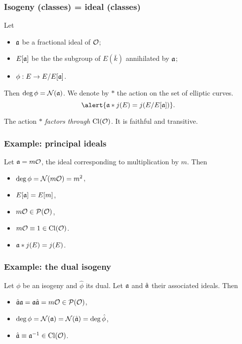 \documentclass{beamer}
\begin{document}

\begin{frame}
  \frametitle{Isogeny (classes) = ideal (classes)}
  
  \begin{definition}
    Let
    \begin{itemize}
    \item \emph{${\mathfrak{a}}$} be a fractional ideal of $\mathcal{O}$;
    \item \emph{$E[{\mathfrak{a}}]$} be the the subgroup of $E(\bar{k})$
      annihilated by ${\mathfrak{a}}$;
    \item \emph{$\phi:E\to E/E[{\mathfrak{a}}]$}.
    \end{itemize}
    Then \emph{$\deg\phi = \mathcal{N}({\mathfrak{a}})$}. We denote by \alert{$\ast$} the
    action on the set of elliptic curves.
    \[\alert{\a\ast j(E) = j(E/E[\a])}.\]
  \end{definition}

  \begin{theorem}
    The action $\ast$ \emph{factors through $\operatorname{Cl}(\mathcal{O})$}. It is faithful
    and transitive.
  \end{theorem}
\end{frame}


\begin{frame}
  \frametitle{Example: principal ideals}

  Let \emph{${\mathfrak{a}} = m\mathcal{O}$}, the ideal corresponding to multiplication by
  $m$. Then
  \begin{itemize}
  \item $\deg\phi = \mathcal{N}(m\mathcal{O}) = m^2$,
  \item $E[{\mathfrak{a}}] = E[m]$,
  \item $m\mathcal{O} \in \mathcal{P}(\mathcal{O})$,
  \item $m\mathcal{O} \equiv 1 \in \operatorname{Cl}(\mathcal{O})$.
  \item ${\mathfrak{a}}\ast j(E) = j(E)$.
  \end{itemize}
\end{frame}


\begin{frame}
  \frametitle{Example: the dual isogeny}

  Let \emph{$\phi$} be an isogeny and \emph{$\hat{\phi}$} its
  dual. Let \emph{${\mathfrak{a}}$} and \emph{$\hat{{\mathfrak{a}}}$} their associated
  ideals. Then
  \begin{itemize}
  \item $\hat{{\mathfrak{a}}}{\mathfrak{a}} = {\mathfrak{a}}\hat{{\mathfrak{a}}} = m\mathcal{O} \in \mathcal{P}(\mathcal{O})$,
  \item $\deg\phi = \mathcal{N}({\mathfrak{a}}) = \mathcal{N}(\hat{{\mathfrak{a}}}) = \deg\hat{\phi}$,
  \item $\hat{{\mathfrak{a}}} \equiv {\mathfrak{a}}^{-1} \in \operatorname{Cl}(\mathcal{O})$.
  \end{itemize}
\end{frame}
\end{document}
